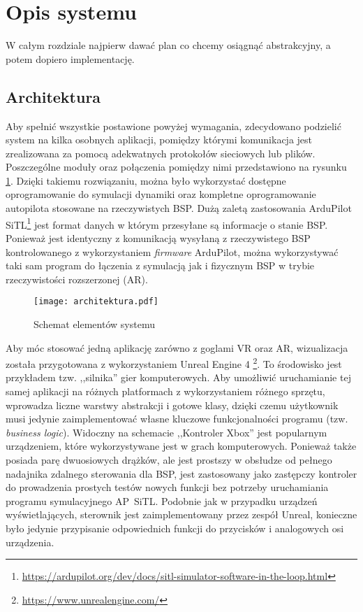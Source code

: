 \newpage
\section{Opis systemu}

\begin{todo}
W całym rozdziale najpierw dawać plan co chcemy osiągnąć abstrakcyjny, a potem dopiero implementację.
\end{todo}

\subsection{Architektura}
\label{sec:architektura}

Aby spełnić wszystkie postawione powyżej wymagania, zdecydowano podzielić system na kilka osobnych aplikacji, pomiędzy którymi komunikacja jest zrealizowana za pomocą adekwatnych protokołów sieciowych lub plików. Poszczególne moduły oraz połączenia pomiędzy nimi przedstawiono na rysunku \ref{fig:architektura}. Dzięki takiemu rozwiązaniu, można było wykorzystać dostępne oprogramowanie do symulacji dynamiki oraz kompletne oprogramowanie autopilota stosowane na rzeczywistych BSP. Dużą zaletą zastosowania ArduPilot SiTL\footnote{\url{https://ardupilot.org/dev/docs/sitl-simulator-software-in-the-loop.html}} jest format danych w którym przesyłane są informacje o stanie BSP. Ponieważ jest identyczny z komunikacją wysyłaną z rzeczywistego BSP kontrolowanego z wykorzystaniem \emph{firmware} ArduPilot, można wykorzystywać taki sam program do łączenia z symulacją jak i fizycznym BSP w trybie rzeczywistości rozszerzonej (AR).

\begin{figure}[!h]
    \caption{Schemat elementów systemu}
    \label{fig:architektura}
    \centering \texttt{[image: architektura.pdf]}
\end{figure}

Aby móc stosować jedną aplikację zarówno z goglami VR oraz AR, wizualizacja została przygotowana z wykorzystaniem Unreal Engine 4 \footnote{\url{https://www.unrealengine.com/}}. To środowisko jest przykładem tzw. ,,silnika'' gier komputerowych. Aby umożliwić uruchamianie tej samej aplikacji na różnych platformach z wykorzystaniem różnego sprzętu, wprowadza liczne warstwy abstrakcji i gotowe klasy, dzięki czemu użytkownik musi jedynie zaimplementować własne kluczowe funkcjonalności programu (tzw. \emph{business logic}). Widoczny na schemacie ,,Kontroler Xbox'' jest popularnym urządzeniem, które wykorzystywane jest w grach komputerowych. Ponieważ także posiada parę dwuosiowych drążków, ale jest prostszy w obsłudze od pełnego nadajnika zdalnego sterowania dla BSP, jest zastosowany jako zastępczy kontroler do prowadzenia prostych testów nowych funkcji bez potrzeby uruchamiania programu symulacyjnego AP~SiTL. Podobnie jak w przypadku urządzeń wyświetlających, sterownik jest zaimplementowany przez zespół Unreal, konieczne było jedynie przypisanie odpowiednich funkcji do przycisków i analogowych osi urządzenia.


